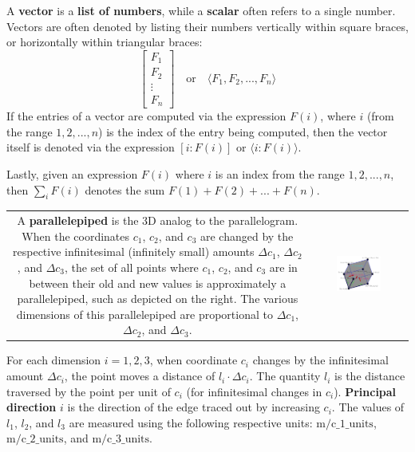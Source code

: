 A \textbf{vector} is a {\bf list of numbers}, while a \textbf{scalar} often refers to a single number. Vectors are often denoted by listing their numbers vertically within square braces, or horizontally within triangular braces: 
\[\begin{bmatrix} F_1 \\ F_2 \\ \vdots \\ F_n \end{bmatrix} \quad\text{or}\quad \langle F_1, F_2, ..., F_n \rangle\]
If the entries of a vector are computed via the expression \(F(i)\), where \(i\) (from the range \(1, 2, ..., n\)) is the index of the entry being computed, then the vector itself is denoted via the expression \([i : F(i)]\) or \(\langle i : F(i) \rangle\).

Lastly, given an expression \(F(i)\) where \(i\) is an index from the range \(1, 2, ..., n\), then \(\sum_i F(i)\) denotes the sum \(F(1) + F(2) + ... + F(n)\).

\vspace{1mm}

\begin{tabular}{cc}
\parbox{0.5\textwidth}{
A {\bf parallelepiped} is the 3D analog to the parallelogram. When the coordinates \(c_1\), \(c_2\), and \(c_3\) are changed by the respective infinitesimal (infinitely small) amounts \(\Delta c_1\), \(\Delta c_2\), and \(\Delta c_3\), the set of all points where \(c_1\), \(c_2\), and \(c_3\) are in between their old and new values is approximately a parallelepiped, such as depicted on the right. The various dimensions of this parallelepiped are proportional to \(\Delta c_1\), \(\Delta c_2\), and \(\Delta c_3\). 
} & \parbox{0.5\textwidth}{
\includegraphics[width = 0.5\textwidth]{Coordinate_systems/coordinate_system_cell}
}
\end{tabular}

\vspace{1mm}

For each dimension \(i = 1, 2, 3\), when coordinate \(c_i\) changes by the infinitesimal amount \(\Delta c_i\), the point moves a distance of \(l_i \cdot \Delta c_i\). The quantity \(l_i\) is the distance traversed by the point per unit of \(c_i\) (for infinitesimal changes in \(c_i\)). {\bf Principal direction} \(i\) is the direction of the edge traced out by increasing \(c_i\). The values of \(l_1\), \(l_2\), and \(l_3\) are measured using the following respective units: \(\text{m}/\text{c\_1\_units}\), \(\text{m}/\text{c\_2\_units}\), and \(\text{m}/\text{c\_3\_units}\).   

